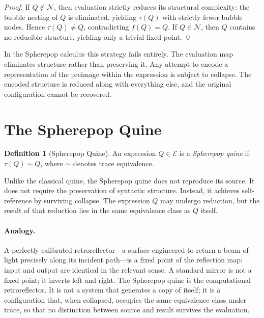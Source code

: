 \documentclass[12pt, oneside]{amsbook}
\theoremstyle{plain}
\theoremstyle{definition}
\newtheorem{definition}[theorem]{Definition}
\theoremstyle{remark}
\newcommand{\Expr}{\mathcal{E}}
\newcommand{\NF}{\mathcal{N}}
\newcommand{\evalf}{f}
\newcommand{\trace}{\tau}
\newcommand{\tequiv}{\sim}
\begin{document}
\begin{proof}
If $Q \notin \NF$, then evaluation strictly reduces its structural complexity:
the bubble nesting of $Q$ is eliminated, yielding $\trace(Q)$ with strictly
fewer bubble nodes. Hence $\trace(Q) \neq Q$, contradicting $\evalf(Q) = Q$.
If $Q \in \NF$, then $Q$ contains no reducible structure, yielding only a
trivial fixed point. \qed
\end{proof}

In the Spherepop calculus this strategy fails entirely. The evaluation map
eliminates structure rather than preserving it. Any attempt to encode a
representation of the preimage within the expression is subject to collapse.
The encoded structure is reduced along with everything else, and the original
configuration cannot be recovered.

\section{The Spherepop Quine}
\label{sec:fixedpoints:spherepop}

\begin{definition}[Spherepop Quine]
\label{def:spherepop-quine}
  An expression $Q \in \Expr$ is a \emph{Spherepop quine} if
  $\trace(Q) \tequiv Q$, where $\tequiv$ denotes trace equivalence.
\end{definition}

Unlike the classical quine, the Spherepop quine does not reproduce its source.
It does not require the preservation of syntactic structure. Instead, it
achieves self-reference by surviving collapse. The expression $Q$ may undergo
reduction, but the result of that reduction lies in the same equivalence class
as $Q$ itself.

\paragraph{Analogy.}
A perfectly calibrated retroreflector---a surface engineered to return a beam of light precisely along its incident path---is a fixed point of the reflection map: input and output are identical in the relevant sense. A standard mirror is not a fixed point; it inverts left and right. The Spherepop quine is the computational retroreflector. It is not a system that generates a copy of itself; it is a configuration that, when collapsed, occupies the same equivalence class under trace, so that no distinction between source and result survives the evaluation.
\end{document}
